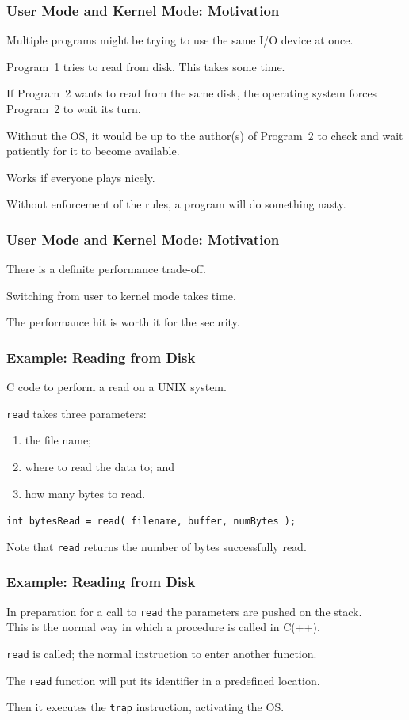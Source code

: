 \begin{frame}
\frametitle{User Mode and Kernel Mode: Motivation}

Multiple programs might be trying to use the same I/O device at once.

Program~1 tries to read from disk. This takes some time.

If Program~2 wants to read from the same disk, the operating system forces Program~2 to wait its turn.

Without the OS, it would be up to the author(s) of Program~2 to check and wait patiently for it to become available. 

Works if everyone plays nicely.

Without enforcement of the rules, a program will do something nasty.

\end{frame}

\begin{frame}
\frametitle{User Mode and Kernel Mode: Motivation}

There is a definite performance trade-off.

Switching from user to kernel mode takes time.

The performance hit is worth it for the security.

\end{frame}

\begin{frame}
\frametitle{Example: Reading from Disk}
C code to perform a read on a UNIX system.

\texttt{read} takes three parameters: 
\begin{enumerate}
	\item the file name; 
	\item where to read the data to; and
	\item how many bytes to read.
\end{enumerate} 

\texttt{int bytesRead = read( filename, buffer, numBytes );}

Note that \texttt{read} returns the number of bytes successfully read.

\end{frame}


\begin{frame}
\frametitle{Example: Reading from Disk}

In preparation for a call to \texttt{read} the parameters are pushed on the stack.\\
\quad This is the normal way in which a procedure is called in C(++). 

\texttt{read} is called; the normal instruction to enter another function.

The \texttt{read} function will put its identifier in a predefined location.

Then it executes the \texttt{trap} instruction, activating the OS.

\end{frame}


